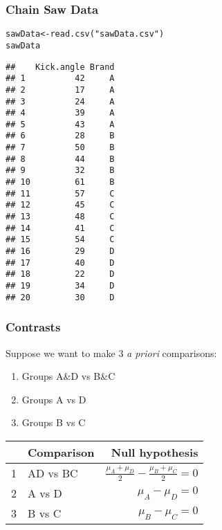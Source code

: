 \documentclass[color=usenames,dvipsnames]{beamer}\usepackage[]{graphicx}\usepackage[]{color}
\makeatletter
\newcommand{\hlstr}[1]{\textcolor[rgb]{0.749,0.012,0.012}{#1}}%
\newcommand{\hlstd}[1]{\textcolor[rgb]{0,0,0}{#1}}%
\newcommand{\hlkwb}[1]{\textcolor[rgb]{0,0.341,0.682}{#1}}%
\newcommand{\hlkwd}[1]{\textcolor[rgb]{0.004,0.004,0.506}{#1}}%
\newenvironment{kframe}{%
 \def\at@end@of@kframe{}%
 \ifinner\ifhmode%
  \def\at@end@of@kframe{\end{minipage}}%
  \begin{minipage}{\columnwidth}%
 \fi\fi%
 \def\FrameCommand##1{\hskip\@totalleftmargin \hskip-\fboxsep
 \colorbox{shadecolor}{##1}\hskip-\fboxsep
     \hskip-\linewidth \hskip-\@totalleftmargin \hskip\columnwidth}%
 \MakeFramed {\advance\hsize-\width
   \@totalleftmargin\z@ \linewidth\hsize
   \@setminipage}}%
 {\par\unskip\endMakeFramed%
 \at@end@of@kframe}
\newenvironment{knitrout}{}{} %
\makeatother
\begin{document}
\begin{frame}[fragile]
  \frametitle{Chain Saw Data}
\begin{knitrout}\scriptsize
{}\color{fgcolor}\begin{kframe}
\begin{alltt}
\hlstd{sawData} \hlkwb{<-} \hlkwd{read.csv}\hlstd{(}\hlstr{"sawData.csv"}\hlstd{)}
\hlstd{sawData}
\end{alltt}
\begin{verbatim}
##    Kick.angle Brand
## 1          42     A
## 2          17     A
## 3          24     A
## 4          39     A
## 5          43     A
## 6          28     B
## 7          50     B
## 8          44     B
## 9          32     B
## 10         61     B
## 11         57     C
## 12         45     C
## 13         48     C
## 14         41     C
## 15         54     C
## 16         29     D
## 17         40     D
## 18         22     D
## 19         34     D
## 20         30     D
\end{verbatim}
\end{kframe}
\end{knitrout}
\end{frame}






\begin{frame}[fragile]
  \frametitle{Contrasts}
  {%
    Suppose we want to make 3 {\it a priori} comparisons:}
  \begin{enumerate}[\bf (1)]
    \item Groups A\&D vs B\&C
    \item Groups A vs D
    \item Groups B vs C
  \end{enumerate}
  \pause
  \vspace{0.5cm}
  \begin{center}
    \begin{tabular}{llr}
      \hline
        & Comparison & Null hypothesis \\
      \hline
      1 & AD vs BC & $\frac{\mu_A + \mu_D}{2} - \frac{\mu_B + \mu_C}{2} = 0$ \\
      2 & A vs D & $\mu_A - \mu_D = 0$ \\
      3 & B vs C & $\mu_B - \mu_C = 0$ \\
      \hline
    \end{tabular}
  \end{center}
\end{frame}
\end{document}

